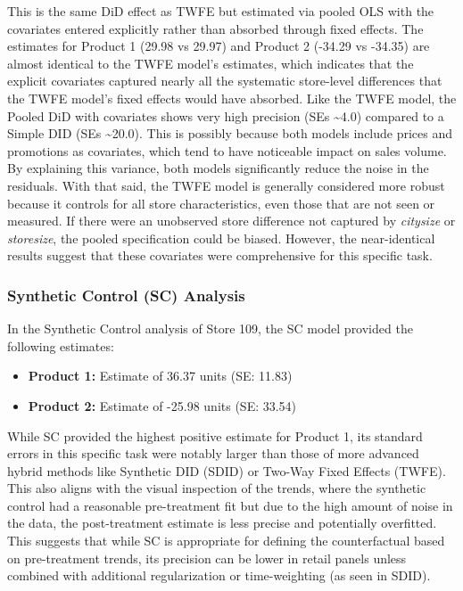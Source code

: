 \documentclass[
  letterpaper,
  DIV=11,
  numbers=noendperiod]{scrartcl}
\providecommand{\tightlist}{%
  \setlength{\itemsep}{0pt}\setlength{\parskip}{0pt}}
\begin{document}
This is the same DiD effect as TWFE but estimated via pooled OLS with
the covariates entered explicitly rather than absorbed through fixed
effects. The estimates for Product 1 (29.98 vs 29.97) and Product 2
(-34.29 vs -34.35) are almost identical to the TWFE model's estimates,
which indicates that the explicit covariates captured nearly all the
systematic store-level differences that the TWFE model's fixed effects
would have absorbed. Like the TWFE model, the Pooled DiD with covariates
shows very high precision (SEs \textasciitilde4.0) compared to a Simple
DID (SEs \textasciitilde20.0). This is possibly because both models
include prices and promotions as covariates, which tend to have
noticeable impact on sales volume. By explaining this variance, both
models significantly reduce the noise in the residuals. With that said,
the TWFE model is generally considered more robust because it controls
for all store characteristics, even those that are not seen or measured.
If there were an unobserved store difference not captured by
\emph{citysize} or \emph{storesize}, the pooled specification could be
biased. However, the near-identical results suggest that these
covariates were comprehensive for this specific task.

\subsubsection{Synthetic Control (SC)
Analysis}\label{synthetic-control-sc-analysis}

In the Synthetic Control analysis of Store 109, the SC model provided
the following estimates:

\begin{itemize}
\tightlist
\item
  \textbf{Product 1:} Estimate of 36.37 units (SE: 11.83)
\item
  \textbf{Product 2:} Estimate of -25.98 units (SE: 33.54)
\end{itemize}

While SC provided the highest positive estimate for Product 1, its
standard errors in this specific task were notably larger than those of
more advanced hybrid methods like Synthetic DID (SDID) or Two-Way Fixed
Effects (TWFE). This also aligns with the visual inspection of the
trends, where the synthetic control had a reasonable pre-treatment fit
but due to the high amount of noise in the data, the post-treatment
estimate is less precise and potentially overfitted. This suggests that
while SC is appropriate for defining the counterfactual based on
pre-treatment trends, its precision can be lower in retail panels unless
combined with additional regularization or time-weighting (as seen in
SDID).
\end{document}
